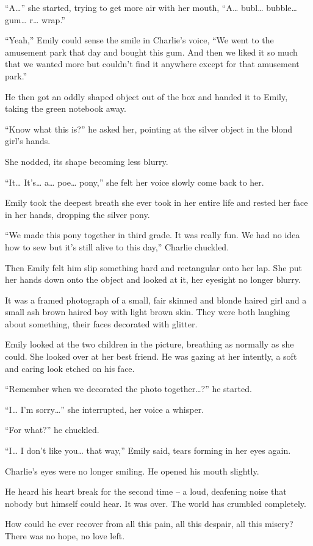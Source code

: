 “A…” she started, trying to get more air with her mouth, “A… bubl… bubble… gum… r… wrap.”

“Yeah,” Emily could sense the smile in Charlie's voice, “We went to the amusement park that day and bought this gum. And then we liked it so much that we wanted more but couldn't find it anywhere except for that amusement park.”

He then got an oddly shaped object out of the box and handed it to Emily, taking the green notebook away.

“Know what this is?” he asked her, pointing at the silver object in the blond girl's hands.

She nodded, its shape becoming less blurry.

“It… It's… a… poe… pony,” she felt her voice slowly come back to her.

Emily took the deepest breath she ever took in her entire life and rested her face in her hands, dropping the silver pony.

“We made this pony together in third grade. It was really fun. We had no idea how to sew but it's still alive to this day,” Charlie chuckled.

Then Emily felt him slip something hard and rectangular onto her lap. She put her hands down onto the object and looked at it, her eyesight no longer blurry.

It was a framed photograph of a small, fair skinned and blonde haired girl and a small ash brown haired boy with light brown skin. They were both laughing about something, their faces decorated with glitter.

Emily looked at the two children in the picture, breathing as normally as she could. She looked over at her best friend. He was gazing at her intently, a soft and caring look etched on his face.

“Remember when we decorated the photo together…?” he started.

“I… I'm sorry…” she interrupted, her voice a whisper.

“For what?” he chuckled.

“I… I don't like you… that way,” Emily said, tears forming in her eyes again.

Charlie's eyes were no longer smiling. He opened his mouth slightly.

He heard his heart break for the second time – a loud, deafening noise that nobody but himself could hear. It was over. The world has crumbled completely.

How could he ever recover from all this pain, all this despair, all this misery? There was no hope, no love left.

